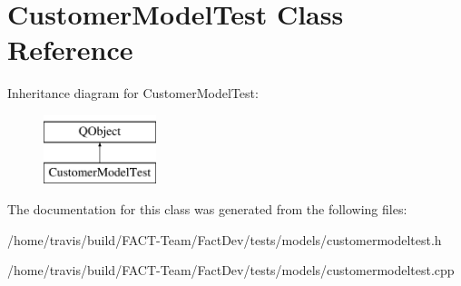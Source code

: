 \hypertarget{classCustomerModelTest}{\section{Customer\-Model\-Test Class Reference}
\label{classCustomerModelTest}
}
Inheritance diagram for Customer\-Model\-Test\-:\begin{figure}[H]
\begin{center}
\leavevmode
\includegraphics[height=2.000000cm]{d5/dcd/classCustomerModelTest}
\end{center}
\end{figure}


The documentation for this class was generated from the following files\-:\begin{DoxyCompactItemize}
\item 
/home/travis/build/\-F\-A\-C\-T-\/\-Team/\-Fact\-Dev/tests/models/customermodeltest.\-h\item 
/home/travis/build/\-F\-A\-C\-T-\/\-Team/\-Fact\-Dev/tests/models/customermodeltest.\-cpp\end{DoxyCompactItemize}
